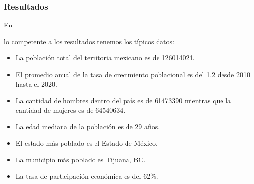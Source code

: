 \documentclass[stu, 12pt, letterpaper, donotrepeattitle, floatsintext, natbib]{apa7}
\begin{document}
\subsubsection{Resultados}
En \begin{justifying}
  lo competente a los resultados tenemos los típicos datos:
  \begin{itemize}
    \item La población total del territoria mexicano es de 126014024.
    \item El promedio anual de la tasa de crecimiento poblacional es del 1.2 desde 2010 hasta el 2020.
    \item La cantidad de hombres dentro del país es de 61473390 mientras que la cantidad de mujeres es de 64540634.
    \item La edad mediana de la población es de 29 años.
    \item El estado más poblado es el Estado de México.
    \item La município más poblado es Tijuana, BC.
    \item La tasa de participación económica es del 62\%.
  \end{itemize}
\end{justifying}
\newpage
\setcounter{secnumdepth}{0} %
\renewcommand\refname{\textbf{Referencias}}
\end{document}
